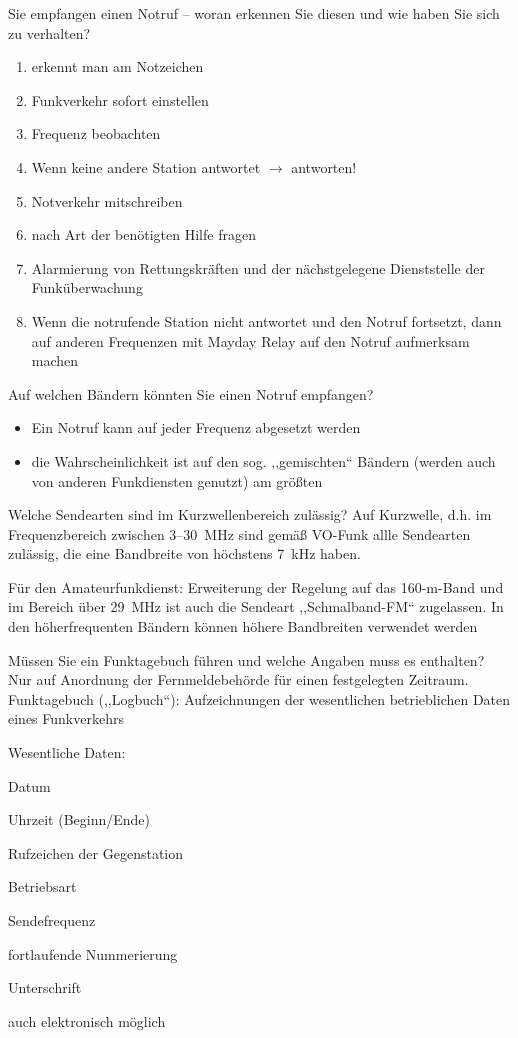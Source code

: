 \documentclass[avery5371,grid,frame,a4paper]{flashcards}
\newcommand{\card}[3]{
  \begin{flashcard}[{\chap} -- #1]{#2}#3\end{flashcard}
}
\begin{document}
\card{34}{Sie empfangen einen Notruf – woran erkennen Sie diesen und wie haben Sie sich zu verhalten?}{
  \footnotesize
  \begin{enumerate}\itemsep0pt
    \item erkennt man am Notzeichen
    \item Funkverkehr sofort einstellen
    \item Frequenz beobachten
    \item Wenn keine andere Station antwortet $\rightarrow$ antworten!
    \item Notverkehr mitschreiben
    \item nach Art der benötigten Hilfe fragen
    \item Alarmierung von Rettungskräften und der nächstgelegene Dienststelle der Funküberwachung
    \item Wenn die notrufende Station nicht antwortet und den Notruf fortsetzt, dann auf anderen Frequenzen mit Mayday Relay auf den Notruf aufmerksam machen
  \end{enumerate}
}
\card{35}{Auf welchen Bändern könnten Sie einen Notruf empfangen?}{
  \begin{itemize}
    \item Ein Notruf kann auf jeder Frequenz abgesetzt werden
    \item die Wahrscheinlichkeit ist auf den sog. ,,gemischten`` Bändern (werden auch von anderen Funkdiensten genutzt) am größten
  \end{itemize}
}
\card{36}{Welche Sendearten sind im Kurzwellenbereich zulässig?}{
  Auf Kurzwelle, d.h. im Frequenzbereich zwischen 3--30~MHz sind gemäß VO-Funk allle Sendearten zulässig, die eine Bandbreite von höchstens 7~kHz haben.

  Für den Amateurfunkdienst: Erweiterung der Regelung auf das 160-m-Band und im Bereich über 29~MHz ist auch die Sendeart ,,Schmalband-FM`` zugelassen. In den höherfrequenten Bändern können höhere Bandbreiten verwendet werden
}
\card{37}{Müssen Sie ein Funktagebuch führen und welche Angaben muss es enthalten?}{
  Nur auf Anordnung der Fernmeldebehörde für einen festgelegten Zeitraum.
  Funktagebuch (,,Logbuch``): Aufzeichnungen der wesentlichen betrieblichen Daten eines Funkverkehrs

  Wesentliche Daten:
  \begin{itemize*}
    \item Datum
    \item Uhrzeit (Beginn/Ende)
    \item Rufzeichen der Gegenstation
    \item Betriebsart
    \item Sendefrequenz
    \item fortlaufende Nummerierung
    \item Unterschrift
    \item auch elektronisch möglich
  \end{itemize*}
}
\end{document}
